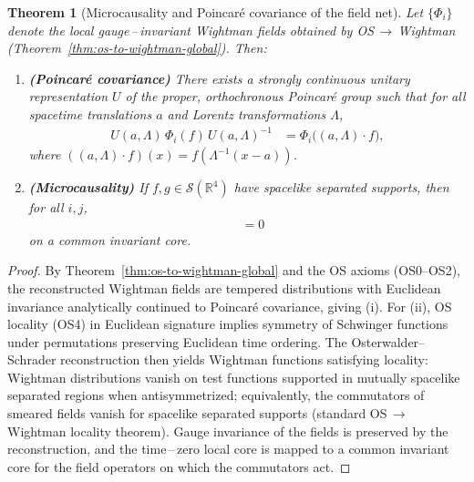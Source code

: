 \documentclass[11pt]{amsart}
\theoremstyle{plain}
\newtheorem{theorem}{Theorem}[section]
\theoremstyle{definition}
\theoremstyle{remark}
\begin{document}
\begin{theorem}[Microcausality and Poincar\'e covariance of the field net]\label{thm:microcausality-poincare}
Let $\{\Phi_i\}$ denote the local gauge\,--\,invariant Wightman fields obtained by OS\,$\to$\,Wightman (Theorem~\ref{thm:os-to-wightman-global}). Then:
\begin{enumerate}[label=(\roman*), leftmargin=2em, itemsep=6pt]
  \item \textbf{(Poincar\'e covariance)} There exists a strongly continuous unitary representation $U$ of the proper, orthochronous Poincar\'e group such that for all spacetime translations $a$ and Lorentz transformations $\Lambda$,
  \begin{align}
    U(a,\Lambda)\,\Phi_i(f)\,U(a,\Lambda)^{-1} &= \Phi_i\big( (a,\Lambda)\cdot f\big),
  \end{align}
  where $((a,\Lambda)\cdot f)(x)=f(\Lambda^{-1}(x-a))$.
  \item \textbf{(Microcausality)} If $f,g\in \mathcal S(\mathbb R^4)$ have spacelike separated supports, then for all $i,j$,
  \begin{align}
    [\,\Phi_i(f),\,\Phi_j(g)\,] &= 0
  \end{align}
  on a common invariant core.
\end{enumerate}
\end{theorem}
\begin{proof}
By Theorem~\ref{thm:os-to-wightman-global} and the OS axioms (OS0--OS2), the reconstructed Wightman fields are tempered distributions with Euclidean invariance analytically continued to Poincar\'e covariance, giving (i). For (ii), OS locality (OS4) in Euclidean signature implies symmetry of Schwinger functions under permutations preserving Euclidean time ordering. The Osterwalder--Schrader reconstruction then yields Wightman functions satisfying locality: Wightman distributions vanish on test functions supported in mutually spacelike separated regions when antisymmetrized; equivalently, the commutators of smeared fields vanish for spacelike separated supports (standard OS\,$\to$\,Wightman locality theorem). Gauge invariance of the fields is preserved by the reconstruction, and the time\,--\,zero local core is mapped to a common invariant core for the field operators on which the commutators act.
\end{proof}
\end{document}
